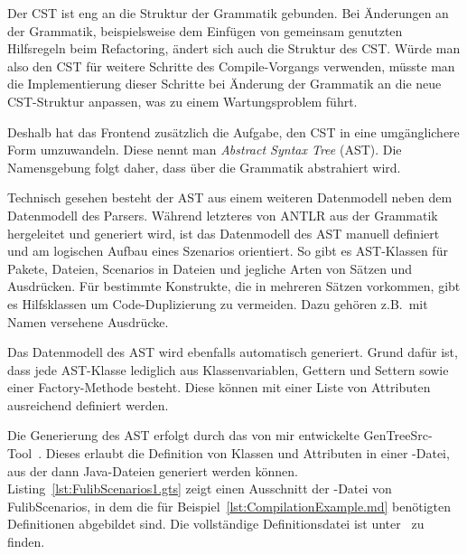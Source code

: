 Der CST ist eng an die Struktur der Grammatik gebunden.
Bei Änderungen an der Grammatik, beispielsweise dem Einfügen von gemeinsam genutzten Hilfsregeln beim Refactoring, ändert sich auch die Struktur des CST\@.
Würde man also den CST für weitere Schritte des Compile-Vorgangs verwenden,
müsste man die Implementierung dieser Schritte bei Änderung der Grammatik an die neue CST-Struktur anpassen,
was zu einem Wartungsproblem führt.

Deshalb hat das Frontend zusätzlich die Aufgabe, den CST in eine umgänglichere Form umzuwandeln.
Diese nennt man \emph{Abstract Syntax Tree} (AST).
Die Namensgebung folgt daher, dass über die Grammatik abstrahiert wird.

Technisch gesehen besteht der AST aus einem weiteren Datenmodell neben dem Datenmodell des Parsers.
Während letzteres von ANTLR aus der Grammatik hergeleitet und generiert wird,
ist das Datenmodell des AST manuell definiert und am logischen Aufbau eines Szenarios orientiert.
So gibt es AST-Klassen für Pakete, Dateien, Scenarios in Dateien und jegliche Arten von Sätzen und Ausdrücken.
Für bestimmte Konstrukte, die in mehreren Sätzen vorkommen, gibt es Hilfsklassen um Code-Duplizierung zu vermeiden.
Dazu gehören z.B.\ mit Namen versehene Ausdrücke.

Das Datenmodell des AST wird ebenfalls automatisch generiert.
Grund dafür ist, dass jede AST-Klasse lediglich aus Klassenvariablen, Gettern und Settern sowie einer Factory-Methode besteht.
Diese können mit einer Liste von Attributen ausreichend definiert werden.

Die Generierung des AST erfolgt durch das von mir entwickelte GenTreeSrc-Tool~\cite{gentreesrc}.
Dieses erlaubt die Definition von Klassen und Attributen in einer -Datei,
aus der dann Java-Dateien generiert werden können.
Listing~\ref{lst:FulibScenarios1.gts} zeigt einen Ausschnitt der -Datei von FulibScenarios,
in dem die für Beispiel~\ref{lst:CompilationExample.md} benötigten Definitionen abgebildet sind.
Die vollständige Definitionsdatei ist unter~\cite{gts-definitions} zu finden.



